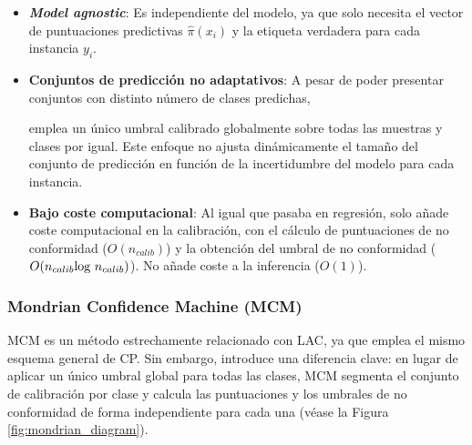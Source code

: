 \begin{itemize}

    \item \textbf{\textit{Model agnostic}}: Es independiente del modelo, ya que solo necesita el vector de puntuaciones predictivas $\hat{\pi}(x_i)$ y la etiqueta verdadera para cada instancia $y_i$.  

    \item \textbf{Conjuntos de predicción no adaptativos}: A pesar de poder presentar conjuntos con distinto número de clases predichas, 
    
    
    emplea un único umbral calibrado globalmente sobre todas las muestras y clases por igual. Este enfoque no ajusta dinámicamente el tamaño del conjunto de predicción en función de la incertidumbre del modelo para cada instancia.

    \item \textbf{Bajo coste computacional}: Al igual que pasaba en regresión, solo añade coste computacional en la calibración, con el cálculo de puntuaciones de no conformidad ($O(n_{calib})$) y la obtención del umbral de no conformidad ($O(n_{calib} \textnormal{log } n_{calib})$). No añade coste a la inferencia ($O(1)$).
    
\end{itemize}


\subsubsection{Mondrian Confidence Machine (MCM)}

\acrshort{MCM} \cite{vovk2003} es un método estrechamente relacionado con \acrshort{LAC}, ya que emplea el mismo esquema general de \acrshort{CP}. Sin embargo, introduce una diferencia clave: en lugar de aplicar un único umbral global para todas las clases, \acrshort{MCM} segmenta el conjunto de calibración por clase y calcula las puntuaciones y los umbrales de no conformidad de forma independiente para cada una (véase la Figura \ref{fig:mondrian_diagram}).

